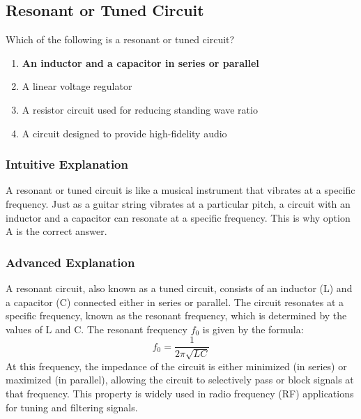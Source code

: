 \subsection{Resonant or Tuned Circuit}
\label{T6D11}

\begin{tcolorbox}[colback=gray!10!white,colframe=black!75!black,title=T6D11]
Which of the following is a resonant or tuned circuit?
\begin{enumerate}[noitemsep]
    \item \textbf{An inductor and a capacitor in series or parallel}
    \item A linear voltage regulator
    \item A resistor circuit used for reducing standing wave ratio
    \item A circuit designed to provide high-fidelity audio
\end{enumerate}
\end{tcolorbox}

\subsubsection*{Intuitive Explanation}
A resonant or tuned circuit is like a musical instrument that vibrates at a specific frequency. Just as a guitar string vibrates at a particular pitch, a circuit with an inductor and a capacitor can resonate at a specific frequency. This is why option A is the correct answer.

\subsubsection*{Advanced Explanation}
A resonant circuit, also known as a tuned circuit, consists of an inductor (L) and a capacitor (C) connected either in series or parallel. The circuit resonates at a specific frequency, known as the resonant frequency, which is determined by the values of L and C. The resonant frequency \( f_0 \) is given by the formula:
\[
f_0 = \frac{1}{2\pi\sqrt{LC}}
\]
At this frequency, the impedance of the circuit is either minimized (in series) or maximized (in parallel), allowing the circuit to selectively pass or block signals at that frequency. This property is widely used in radio frequency (RF) applications for tuning and filtering signals.